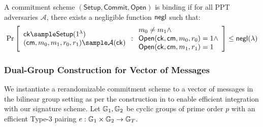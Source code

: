 \begin{definition}[Binding]
A commitment scheme $(\mathsf{Setup}, \mathsf{Commit}, \mathsf{Open})$ is binding if for all PPT adversaries $\mathcal{A}$, there exists a negligible function $\mathsf{negl}$ such that:
$$\Pr\left[\begin{array}{l}
    \mathsf{ck} \sample \mathsf{Setup}(1^\lambda) \\
    (\mathsf{cm}, m_0, m_1, r_0, r_1) \sample \mathcal{A}(\mathsf{ck})
\end{array} : \begin{array}{l}
    m_0 \neq m_1 \land \\
    \mathsf{Open}(\mathsf{ck}, \mathsf{cm}, m_0, r_0) = 1 \land \\
    \mathsf{Open}(\mathsf{ck}, \mathsf{cm}, m_1, r_1) = 1
\end{array}\right] \leq \negl(\lambda)$$
\end{definition}



\subsubsection{Dual-Group Construction for Vector of Messages}

We instantiate a rerandomizable commitment scheme to a vector of messages in the bilinear group setting as per the construction in \cite{tomescu_utt_2022} to enable efficient integration with our signature scheme. Let $\mathbb{G}_1, \mathbb{G}_2$ be cyclic groups of prime order $p$ with an efficient Type-3 pairing $e: \mathbb{G}_1 \times \mathbb{G}_2 \to \mathbb{G}_T$.

